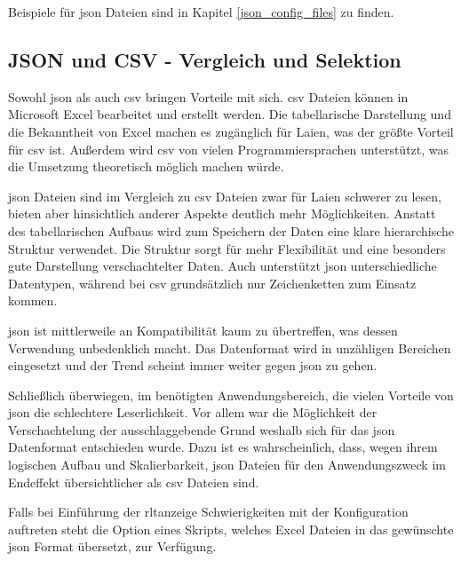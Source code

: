 Beispiele für \acs{json} Dateien sind in Kapitel \ref{json_config_files} zu finden.

\subsection{JSON und CSV - Vergleich und Selektion} \label{json_vs_csv}
Sowohl \acs{json} als auch \acs{csv} bringen Vorteile mit sich. 
\acs{csv} Dateien können in Microsoft Excel bearbeitet und erstellt werden. Die tabellarische Darstellung und die Bekanntheit von Excel machen es zugänglich für Laien, was der größte Vorteil für \acs{csv} ist. Außerdem wird \acs{csv} von vielen Programmiersprachen unterstützt, was die Umsetzung theoretisch möglich machen würde. 

\acs{json} Dateien sind im Vergleich zu \acs{csv} Dateien zwar für Laien schwerer zu lesen, bieten aber hinsichtlich anderer Aspekte deutlich mehr Möglichkeiten. Anstatt des tabellarischen Aufbaus wird zum Speichern der Daten eine klare hierarchische Struktur verwendet. Die Struktur sorgt für mehr Flexibilität und eine besonders gute Darstellung verschachtelter Daten. Auch unterstützt \acs{json} unterschiedliche Datentypen, während bei \acs{csv} grundsätzlich nur Zeichenketten zum Einsatz kommen.

\acs{json} ist mittlerweile an Kompatibilität kaum zu übertreffen, was dessen Verwendung unbedenklich macht. Das Datenformat wird in unzähligen Bereichen eingesetzt und der Trend scheint immer weiter gegen \acs{json} zu gehen.

Schließlich überwiegen, im benötigten Anwendungsbereich, die vielen Vorteile von \acs{json} die schlechtere Leserlichkeit. Vor allem war die Möglichkeit der Verschachtelung der ausschlaggebende Grund weshalb sich für das \acs{json} Datenformat entschieden wurde. Dazu ist es wahrscheinlich, dass, wegen ihrem logischen Aufbau und  Skalierbarkeit, \acs{json} Dateien für den Anwendungszweck im Endeffekt übersichtlicher als \acs{csv} Dateien sind.

Falls bei Einführung der \acs{rltanzeige} Schwierigkeiten mit der Konfiguration auftreten steht \zB die Option eines Skripts, welches Excel Dateien in das gewünschte \acs{json} Format übersetzt, zur Verfügung.

